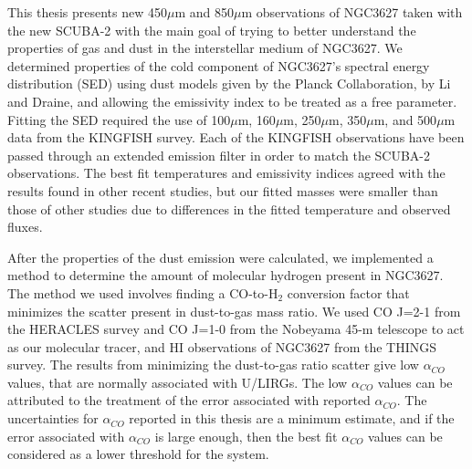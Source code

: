 This thesis presents new 450$\mu$m and 850$\mu$m observations of NGC3627 taken with the new SCUBA-2 with the main goal of trying to better understand the properties of gas and dust in the interstellar medium of NGC3627.  We determined properties of the cold component of NGC3627's spectral energy distribution (SED) using dust models given by the Planck Collaboration, by Li and Draine, and allowing the emissivity index to be treated as a free parameter.  Fitting the SED required the use of 100$\mu$m, 160$\mu$m, 250$\mu$m, 350$\mu$m, and 500$\mu$m data from the KINGFISH survey.  Each of the KINGFISH observations have been passed through an extended emission filter in order to match the SCUBA-2 observations.  The best fit temperatures and emissivity indices agreed with the results found in other recent studies, but our fitted masses were smaller than those of other studies due to differences in the fitted temperature and observed fluxes.

After the properties of the dust emission were calculated, we implemented a method to determine the amount of molecular hydrogen present in NGC3627.  The method we used involves finding a CO-to-H$_2$ conversion factor that minimizes the scatter present in dust-to-gas mass ratio. We used CO J=2-1 from the HERACLES survey and CO J=1-0 from the Nobeyama 45-m telescope to act as our molecular tracer, and HI observations of NGC3627 from the THINGS survey.  The results from minimizing the dust-to-gas ratio scatter give low $\alpha_{CO}$ values, that are normally associated with U/LIRGs.  The low $\alpha_{CO}$ values can be attributed to the treatment of the error associated with reported $\alpha_{CO}$.  The uncertainties for $\alpha_{CO}$ reported in this thesis are a minimum estimate, and if the error associated with $\alpha_{CO}$ is large enough, then the best fit $\alpha_{CO}$ values can be considered as a lower threshold for the system.